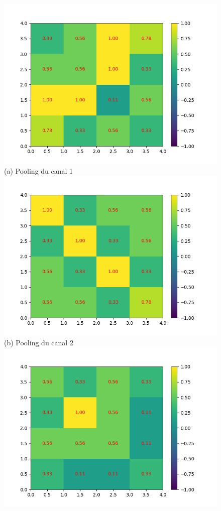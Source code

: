 \begin{figure}[h]
        \includegraphics[width=\textwidth]{img/cnn_exemple/cross/stride_1_max.png}
        \center 
        (a) Pooling du canal 1
    \endminipage\hfill
        \includegraphics[width=\textwidth]{img/cnn_exemple/cross/stride_2_max.png}
        \center 
        (b) Pooling du canal 2
    \endminipage\hfill
        \includegraphics[width=\textwidth]{img/cnn_exemple/cross/stride_3_max.png}

\end{figure}
